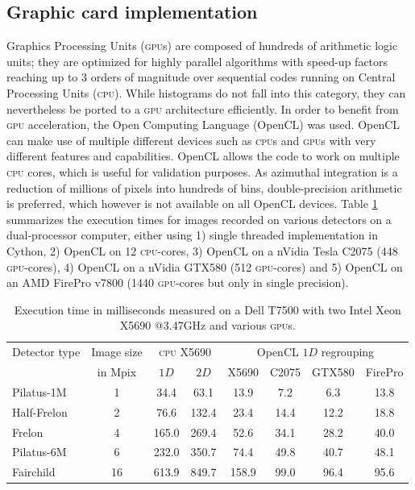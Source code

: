 \documentclass[a4paper]{jpconf}
\begin{document}
\subsection{Graphic card implementation}
Graphics Processing Units (\textsc{gpu}s) are composed of hundreds of
arithmetic logic units; they are optimized for highly
parallel algorithms with speed-up factors reaching up to 3 orders of magnitude
over sequential codes running on Central Processing Units (\textsc{cpu}).
While histograms do not fall into this category, they can nevertheless be
ported to a \textsc{gpu} architecture efficiently.
In order to benefit from \textsc{gpu} acceleration,
the Open Computing Language\cite{opencl} (OpenCL) was used. OpenCL can make use
of multiple different devices such as \textsc{cpu}s and \textsc{gpu}s with very
different features and capabilities.
OpenCL allows the code to work on multiple \textsc{cpu} cores, which is
useful for validation purposes.
As azimuthal integration is a reduction
of millions of pixels into hundreds of bins, double-precision arithmetic is
preferred, which however is not available on all OpenCL devices.
Table \ref{perfs} summarizes the execution times for images recorded on
various detectors on a dual-processor computer, either using
1) single threaded implementation in Cython,
2) OpenCL on 12 \textsc{cpu}-cores,
3) OpenCL on a nVidia Tesla C2075 (448 \textsc{gpu}-cores),
4) OpenCL on a nVidia GTX580 (512 \textsc{gpu}-cores) and
5) OpenCL on an AMD FirePro v7800 (1440 \textsc{gpu}-cores but only in single
precision).

\begin{table}[h]
\caption{\label{perfs}Execution time in milliseconds measured on a
Dell T7500 with two Intel Xeon X5690 @3.47GHz and various \textsc{gpu}s.}
\vspace{1mm}
\begin{center}
\begin{tabular}{|l|c||c|c||c|c|c|c|}
\hline
Detector type   & Image size 	& \multicolumn{2}{|c||}{\textsc{cpu} X5690}& \multicolumn{4}{|c|}{OpenCL $1D$ regrouping} \\
					& in Mpix		& $1D$	&	$2D$	&	X5690	&	C2075	&	GTX580	&	FirePro \\
\hline
Pilatus-1M 			& 1  			& 34.4  &	63.1	&	13.9	&	7.2		&	6.3		&	13.8 \\
Half-Frelon 		& 2  			& 76.6  &   132.4   &	23.4	&	14.4	&	12.2	&	18.8 \\
Frelon 				& 4  			& 165.0	&	269.4   &	52.6	&	34.1	&	28.2	&	40.0 \\
Pilatus-6M 			& 6  			& 232.0	&	350.7	&	74.4	&	49.8	&	40.7	&	48.1 \\
Fairchild 			& 16 			& 613.9	&	849.7   &	158.9	&	99.0	&	96.4	&	95.6 \\
\hline
\end{tabular}
\end{center}
\end{table}
\end{document}
